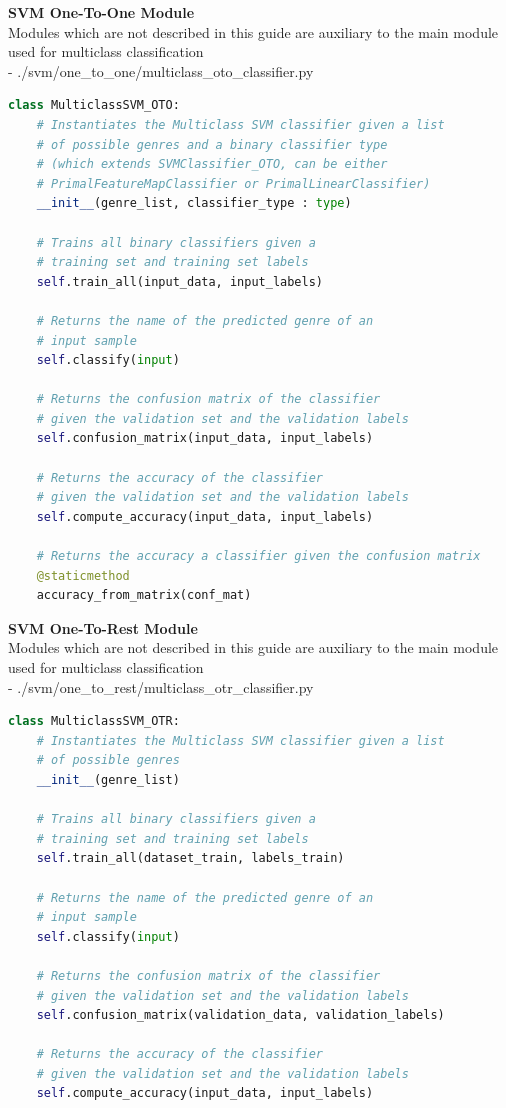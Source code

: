 \documentclass[12pt]{article}
\begin{document}
	\newpage
	\textbf{SVM One-To-One Module}\mbox{}\\
	Modules which are not described in this guide are auxiliary to the main module used for multiclass classification\\ \newline
	- ./svm/one\_to\_one/multiclass\_oto\_classifier.py
	\begin{lstlisting}[language=Python]
class MulticlassSVM_OTO:
	# Instantiates the Multiclass SVM classifier given a list
	# of possible genres and a binary classifier type
	# (which extends SVMClassifier_OTO, can be either
	# PrimalFeatureMapClassifier or PrimalLinearClassifier)
	__init__(genre_list, classifier_type : type)
	
	# Trains all binary classifiers given a
	# training set and training set labels
	self.train_all(input_data, input_labels)
	
	# Returns the name of the predicted genre of an
	# input sample
	self.classify(input)
	
	# Returns the confusion matrix of the classifier
	# given the validation set and the validation labels
	self.confusion_matrix(input_data, input_labels)
	
	# Returns the accuracy of the classifier
	# given the validation set and the validation labels
	self.compute_accuracy(input_data, input_labels)
	
	# Returns the accuracy a classifier given the confusion matrix
	@staticmethod
	accuracy_from_matrix(conf_mat)
	\end{lstlisting}
	\newpage
	\textbf{SVM One-To-Rest Module}\mbox{}\\
	Modules which are not described in this guide are auxiliary to the main module used for multiclass classification\\ \newline
	- ./svm/one\_to\_rest/multiclass\_otr\_classifier.py
	\begin{lstlisting}[language=Python]
class MulticlassSVM_OTR:
	# Instantiates the Multiclass SVM classifier given a list
	# of possible genres
	__init__(genre_list)
	
	# Trains all binary classifiers given a
	# training set and training set labels
	self.train_all(dataset_train, labels_train)
	
	# Returns the name of the predicted genre of an
	# input sample
	self.classify(input)
	
	# Returns the confusion matrix of the classifier
	# given the validation set and the validation labels
	self.confusion_matrix(validation_data, validation_labels)
	
	# Returns the accuracy of the classifier
	# given the validation set and the validation labels
	self.compute_accuracy(input_data, input_labels)
	\end{lstlisting}
	\newpage
	\printbibliography
\end{document}
